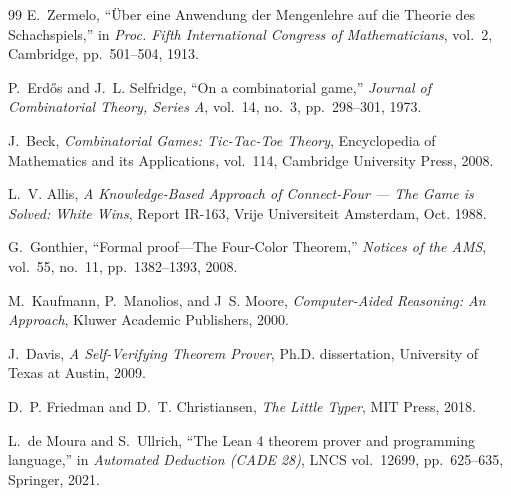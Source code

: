 \documentclass[11pt,reqno]{amsart}
\theoremstyle{plain}
\theoremstyle{definition}
\theoremstyle{remark}
\begin{document}
\begin{thebibliography}{99}
E.~Zermelo, ``\"Uber eine Anwendung der Mengenlehre auf die Theorie des Schachspiels,'' in \emph{Proc. Fifth International Congress of Mathematicians}, vol.~2, Cambridge, pp.~501--504, 1913.

P.~Erd\H{o}s and J.~L. Selfridge, ``On a combinatorial game,'' \emph{Journal of Combinatorial Theory, Series A}, vol.~14, no.~3, pp.~298--301, 1973.

J.~Beck, \emph{Combinatorial Games: Tic-Tac-Toe Theory}, Encyclopedia of Mathematics and its Applications, vol.~114, Cambridge University Press, 2008.

L.~V. Allis, \emph{A Knowledge-Based Approach of Connect-Four --- The Game is Solved: White Wins}, Report IR-163, Vrije Universiteit Amsterdam, Oct. 1988.

G.~Gonthier, ``Formal proof---The Four-Color Theorem,'' \emph{Notices of the AMS}, vol.~55, no.~11, pp.~1382--1393, 2008.

M.~Kaufmann, P.~Manolios, and J~S. Moore, \emph{Computer-Aided Reasoning: An Approach}, Kluwer Academic Publishers, 2000.

J.~Davis, \emph{A Self-Verifying Theorem Prover}, Ph.D. dissertation, University of Texas at Austin, 2009.

D.~P. Friedman and D.~T. Christiansen, \emph{The Little Typer}, MIT Press, 2018.

L.~de Moura and S.~Ullrich, ``The Lean 4 theorem prover and programming language,'' in \emph{Automated Deduction (CADE 28)}, LNCS vol.~12699, pp.~625--635, Springer, 2021.
\end{thebibliography}
\end{document}
